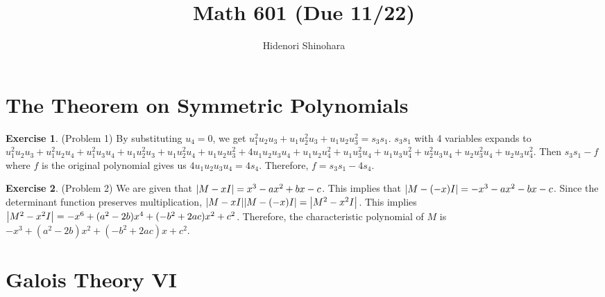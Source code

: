\documentclass[12pt, psamsfonts]{amsart}
\theoremstyle{definition}
\newtheorem*{exer}{Exercise}
\theoremstyle{remark}
\numberwithin{equation}{section}
\begin{document}
\title{Math 601 (Due 11/22)}
\author{Hidenori Shinohara}
\maketitle

\tableofcontents
\section{The Theorem on Symmetric Polynomials}

\begin{exer}{(Problem 1)}
  By substituting $u_4 = 0$, we get $u_1^2u_2u_3 + u_1u_2^2u_3 + u_1u_2u_3^2 = s_3s_1$.
  $s_3s_1$ with 4 variables expands to $u_{1}^{2} u_{2} u_{3} + u_{1}^{2} u_{2} u_{4} + u_{1}^{2} u_{3} u_{4} + u_{1} u_{2}^{2} u_{3} + u_{1} u_{2}^{2} u_{4} + u_{1} u_{2} u_{3}^{2} + 4 u_{1} u_{2} u_{3} u_{4} + u_{1} u_{2} u_{4}^{2} + u_{1} u_{3}^{2} u_{4} + u_{1} u_{3} u_{4}^{2} + u_{2}^{2} u_{3} u_{4} + u_{2} u_{3}^{2} u_{4} + u_{2} u_{3} u_{4}^{2}$.
  Then $s_3s_1 - f$ where $f$ is the original polynomial gives us $4u_1u_2u_3u_4 = 4s_4$.
  Therefore, $f = s_3s_1 - 4s_4$.
\end{exer}

\begin{exer}{(Problem 2)}
  We are given that $\abs{M - xI} = x^3 - ax^2 + bx - c$.
  This implies that $\abs{M - (-x)I} = -x^3 - ax^2 - bx - c$.
  Since the determinant function preserves multiplication, $\abs{M - xI}\abs{M - (-x)I} = \abs{M^2 - x^2I}$.
  This implies $\abs{M^2 - x^2I} = -x^6 + (a^2 - 2b)x^4 + (-b^2 + 2ac)x^2 + c^2$.
  Therefore, the characteristic polynomial of $M$ is $-x^3 + (a^2 - 2b)x^2 + (-b^2 + 2ac)x + c^2$.
\end{exer}

\section{Galois Theory VI}
\end{document}
